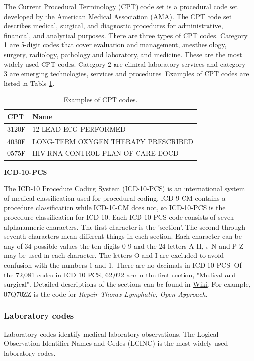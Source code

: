 The Current Procedural Terminology (CPT) code set is a procedural code set developed by the American Medical Association (AMA). The CPT code set describes medical, surgical, and diagnostic procedures for administrative, financial, and analytical purposes. There are three types of CPT codes. Category 1 are 5-digit codes that cover evaluation and management, anesthesiology, surgery, radiology, pathology and laboratory, and medicine. These are the most widely used CPT codes. Category 2 are clinical laboratory services and category 3 are emerging technologies, services and procedures. Examples of CPT codes are listed in Table \ref{tab:cpt}.

\begin{table}[ht]
\centering
\begin{tabular}{ll}
\toprule
CPT & Name \\ \hline
3120F & 12-LEAD ECG PERFORMED               \\ \hline
4030F & LONG-TERM OXYGEN THERAPY PRESCRIBED \\ \hline
0575F & HIV RNA CONTROL PLAN OF CARE DOCD   \\ \bottomrule
\end{tabular}
\caption{Examples of CPT codes.}
\label{tab:cpt}
\end{table}

\textbf{ICD-10-PCS}

The ICD-10 Procedure Coding System (ICD-10-PCS) is an international system of medical classification used for procedural coding. ICD-9-CM contains a procedure classification while ICD-10-CM does not, so ICD-10-PCS is the procedure classification for ICD-10. Each ICD-10-PCS code consists of seven alphanumeric characters. The first character is the 'section'. The second through seventh characters mean different things in each section. Each character can be any of 34 possible values the ten digits 0-9 and the 24 letters A-H, J-N and P-Z may be used in each character. The letters O and I are excluded to avoid confusion with the numbers 0 and 1. There are no decimals in ICD-10-PCS. Of the 72,081 codes in ICD-10-PCS, 62,022 are in the first section, "Medical and surgical". Detailed descriptions of the sections can be found in \href{https://en.wikipedia.org/wiki/ICD-10_Procedure_Coding_System#Section_structure}{Wiki}. For example, 07Q70ZZ is the code for \textit{Repair Thorax Lymphatic, Open Approach}.

\subsubsection{Laboratory codes}
Laboratory codes identify medical laboratory observations. The Logical Observation Identifier Names and Codes (LOINC) is the most widely-used laboratory codes.

